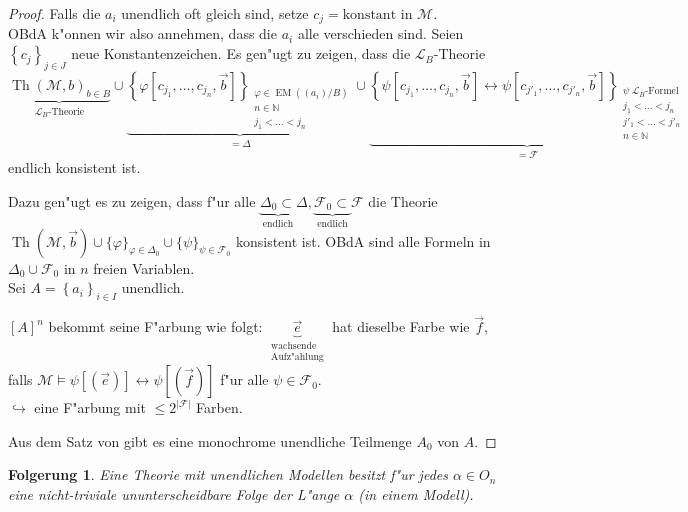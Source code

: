 \documentclass[a4paper,12pt,numbers=noenddot,parskip=full]{scrartcl}
\newcommand{\setN}{\mathbb{N}}
\newcommand{\scrL}{\mathcal{L}}
\newcommand{\scrM}{\mathcal{M}}
\DeclareMathOperator{\EM}{EM}
\DeclareMathOperator{\Th}{Th}
\theoremstyle{dotless}
\newtheorem{corollary}[theorem]{Folgerung}
\begin{document}
\begin{proof}
	Falls die $a_i$ unendlich oft gleich sind, setze $c_j = \text{konstant}$ in $\scrM$.\\
	OBdA k"onnen wir also annehmen, dass die $a_i$ alle verschieden sind. Seien $\left\{c_j\right\}_{j \in J}$ neue Konstantenzeichen. Es gen"ugt zu zeigen, dass die $\scrL_B$-Theorie
	\begin{equation*}
		\underbrace{\Th(\scrM,b)_{b \in B}}_{\scrL_B\text{-Theorie}} \cup
		\underbrace{\left\{\varphi\left[c_{j_1}, \dots, c_{j_n}, \vec{b}\right]\right\}_{\substack{\varphi \in \EM \left((a_i)/B\right)\\n \in \setN\\j_1<\dots<j_n}}}_{=\Delta} \cup 
		\underbrace{\left\{\psi\left[c_{j_1}, \dots, c_{j_n}, \vec{b} \right] \leftrightarrow \psi\left[c_{j'_1}, \dots, c_{j'_n}, \vec{b} \right] \right\}_{\substack{\psi~ \scrL_B \text{-Formel}\\j_1<\dots<j_n\\j'_1<\dots<j'_n\\n \in \setN}}}_{=\mathcal{F}}
	\end{equation*}
	endlich konsistent ist.
	
	Dazu gen"ugt es zu zeigen, dass f"ur alle $\underbrace{\Delta_0 \subset}_\text{endlich} \Delta, \underbrace{\mathcal{F}_0 \subset}_\text{endlich} \mathcal{F}$ die Theorie $\Th(\scrM, \vec{b}) \cup \{\varphi\}_{\varphi \in \Delta_0} \cup \{\psi\}_{\psi \in \mathcal{F}_0}$ konsistent ist. OBdA sind alle Formeln in $\Delta_0 \cup \mathcal{F}_0$ in $n$ freien Variablen. \\Sei $A = \left\{a_i\right\}_{i \in I}$ unendlich.
	
	$\left[A\right]^n$ bekommt seine F"arbung wie folgt: $\underbrace{\vec{e}}_{\substack{\text{wachsende}\\\text{Aufz"ahlung}}}$ hat dieselbe Farbe wie $\vec{f}$, falls $\scrM \models \psi \left[ \left(\vec{e}\right) \right] \leftrightarrow \psi [(\vec{f})]$ f"ur alle $\psi \in \mathcal{F}_0$.\\
	$\hookrightarrow$ eine F"arbung mit $\leq 2^{|\mathcal{F}|}$ Farben.
	
	Aus dem Satz von  gibt es eine monochrome unendliche Teilmenge $A_0$ von $A$.
\end{proof}
\begin{corollary}
	Eine Theorie mit unendlichen Modellen besitzt f"ur jedes $\alpha \in O_n$ eine nicht-triviale ununterscheidbare Folge der L"ange $\alpha$ (in einem Modell).
\end{corollary}
\end{document}
